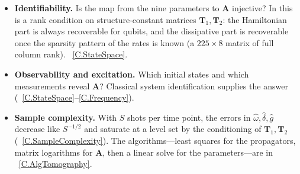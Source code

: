 \documentclass[handoutsbeamer.tex]{subfiles}
\begin{document}
\begin{frame}
\onp{\begin{center}\resizebox{\linewidth}{!}{}\end{center}}
\end{frame}

\begin{frame}
\begin{itemize}\setlength\itemsep{0.3em}
    \item \textbf{Identifiability.} Is the map from the nine parameters to $\mathbf A$ injective? In \citet{parvaiz2025identifiability} this is a rank condition on structure-constant matrices $\mathbf T_1,\mathbf T_2$: the Hamiltonian part is always recoverable for qubits, and the dissipative part is recoverable once the sparsity pattern of the rates is known (a $225\times 8$ matrix of full column rank). \Chap~\ref{C.StateSpace}.
    \item \textbf{Observability and excitation.} Which initial states and which measurements reveal $\mathbf A$? Classical system identification supplies the answer (\Chaps~\ref{C.StateSpace}--\ref{C.Frequency}).
    \item \textbf{Sample complexity.} With $S$ shots per time point, the errors in $\hat\omega,\hat\delta,\hat g$ decrease like $S^{-1/2}$ and saturate at a level set by the conditioning of $\mathbf T_1,\mathbf T_2$ (\Chap~\ref{C.SampleComplexity}). The algorithms---least squares for the propagators, matrix logarithms for $\mathbf A$, then a linear solve for the parameters---are in \Chap~\ref{C.AlgTomography}.
\end{itemize}
\end{frame}
\end{document}

